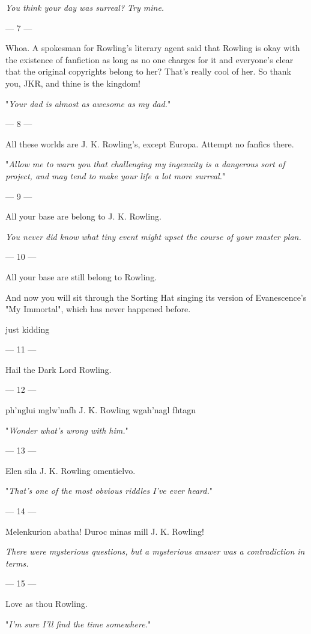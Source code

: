{\emph{You think your day was surreal? Try mine.}

\filbreak
--- 7 ---

Whoa. A spokesman
for Rowling's literary agent said that Rowling is okay with the existence of
fanfiction as long as no one charges for it and everyone's clear that the
original copyrights belong to her? That's really cool of her. So thank you,
JKR, and thine is the kingdom!

"\emph{Your dad is almost as awesome as my dad.}"

\filbreak
--- 8 ---

All these worlds
are J. K. Rowling's, except Europa. Attempt no fanfics there.

"\emph{Allow me to warn you that challenging my ingenuity is a dangerous sort
of project, and may tend to make your life a lot more surreal.}"

\filbreak
--- 9 ---

All your base are
belong to J. K. Rowling.

\emph{You never did know what tiny event might upset the course of your master
plan.}

\filbreak
--- 10 ---

All your base are
still belong to Rowling.

And now you will sit through the Sorting Hat singing its version of
Evanescence's "My Immortal", which has never happened before.

just kidding

\filbreak
--- 11 ---

Hail the Dark Lord Rowling.

\filbreak
--- 12 ---

ph'nglui mglw'nafh J. K. Rowling wgah'nagl fhtagn

"\emph{Wonder what's wrong with \emph{him}.}"

\filbreak
--- 13 ---

Elen sila J. K. Rowling omentielvo.

"\emph{That's one of the most obvious riddles I've ever heard.}"

\filbreak
--- 14 ---

Melenkurion abatha! Duroc minas mill J. K. Rowling!

\emph{There were mysterious questions, but a mysterious answer was a
contradiction in terms.}

\filbreak
--- 15 ---

Love as thou Rowling.

"\emph{I'm sure I'll find the time somewhere.}"

}
